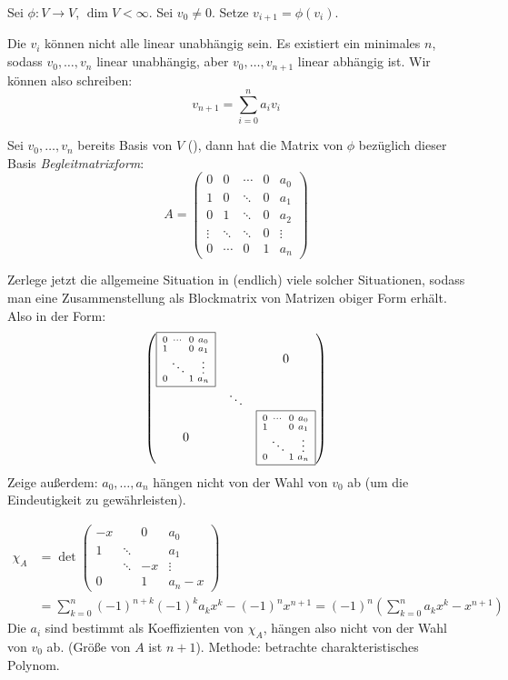 \documentclass{mycourse}
\begin{document}
\begin{ex}
Sei $\phi:V\to V$, $\dim V<\infty$.
Sei $v_0\neq 0$.
Setze $v_{i+1}=\phi(v_i)$.

Die $v_i$ können nicht alle linear unabhängig sein.
Es existiert ein minimales $n$, sodass $v_0,\dotsc,v_n$ linear unabhängig, aber $v_0,\dotsc,v_{n+1}$ linear abhängig ist.
Wir können also schreiben:
\[
v_{n+1} = \sum_{i=0}^n a_iv_i
\]

Sei $v_0,\dotsc,v_n$ bereits Basis von $V$ (\fixme[Verwirrend, denn $\dim V=n+1$]), dann hat die Matrix von $\phi$ bezüglich dieser Basis \emph{Begleitmatrixform}:
\[
A= \begin{pmatrix}
0 & 0 & \cdots & 0 & a_0\\
1 & 0 & \ddots & 0 & a_1\\
0 & 1 & \ddots & 0 & a_2\\
\vdots & \ddots & \ddots & 0 & \vdots\\
0 & \cdots & 0 & 1 & a_n
\end{pmatrix}
\]

Zerlege jetzt die allgemeine Situation in (endlich) viele solcher Situationen, sodass man eine Zusammenstellung als Blockmatrix von Matrizen obiger Form erhält. Also in der Form:
\[
\begin{pmatrix}
  \fbox{$\begin{smallmatrix} 0 & \cdots  & 0 & a_0 \\ 1 &  & 0 & a_1 \\ & \ddots &  & \vdots \\ 0 &  & 1 & a_n  \end {smallmatrix}$}  &  & 0 \\
 & \ddots &  \\
0 &  & \fbox{$\begin{smallmatrix} 0 & \cdots  & 0 & a_0 \\ 1 &  & 0 & a_1 \\ & \ddots &  & \vdots \\ 0 &  & 1 & a_n  \end {smallmatrix}$}
\end{pmatrix}
\]
Zeige außerdem: $a_0,\dotsc,a_n$ hängen nicht von der Wahl von $v_0$ ab (um die Eindeutigkeit zu gewährleisten).


\begin{align*}
\chi_A &= \det \begin{pmatrix} -x &   & 0 & a_0 \\ 1 & \ddots  &  & a_1 \\ & \ddots & -x  & \vdots \\ 0 &  & 1 & a_n-x  \end {pmatrix} \\  &=  \sum_{k=0}^{n} (-1)^{n+k} (-1)^ka_kx^k - (-1)^nx^{n+1}= (-1)^n \left (\sum_{k=0}^{n} a_kx^k - x^{n+1} \right )
\end{align*}
Die $a_i$ sind bestimmt als Koeffizienten von $\chi_A$, hängen also nicht von der Wahl von $v_0$ ab.
(Größe von $A$ ist $n+1$).
Methode:  betrachte charakteristisches Polynom.
\end{ex}
\end{document}
